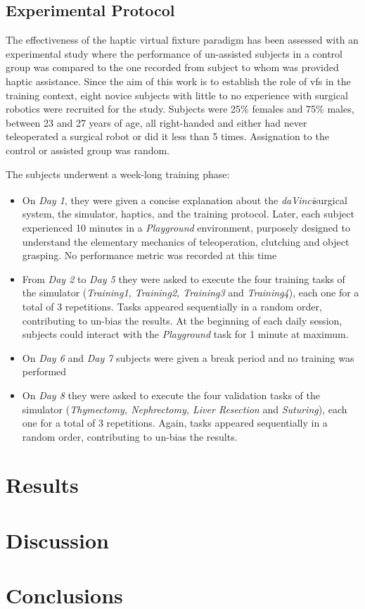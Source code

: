 \documentclass{article}
\newcommand{\cright}{\textsuperscript{\textregistered}\phantom{..}}
\begin{document}
\begin{multicols}{2}
\subsection{Experimental Protocol}
The effectiveness of the haptic virtual fixture paradigm has been assessed with an experimental study where the performance of un-assisted subjects in a control group was compared to the one recorded from subject to whom was provided haptic assistance. Since the aim of this work is to establish the role of \acp{vf} in the training context, eight novice subjects with little to no experience with surgical robotics were recruited for the study. Subjects were 25\% females and 75\% males, between 23 and 27 years of age, all right-handed and either had never teleoperated a surgical robot or did it less than 5 times. Assignation to the control or assisted group was random.

The subjects underwent a week-long training phase:
\begin{itemize}
  \item On \textit{Day 1}, they were given a concise explanation about the \textit{daVinci}\cright surgical system, the simulator, haptics, and the training protocol. Later, each subject experienced 10 minutes in a \textit{Playground} environment, purposely designed to understand the elementary mechanics of teleoperation, clutching and object grasping. No performance metric was recorded at this time
  \item From \textit{Day 2} to \textit{Day 5} they were asked to execute the four training tasks of the simulator (\textit{Training1, Training2, Training3} and \textit{Training4}), each one for a total of 3 repetitions. Tasks appeared sequentially in a random order, contributing to un-bias the results. At the beginning of each daily session, subjects could interact with the \textit{Playground} task for 1 minute at maximum.
  \item On \textit{Day 6} and \textit{Day 7} subjects were given a break period and no training was performed
  \item On \textit{Day 8} they were asked to execute the four validation tasks of the simulator (\textit{Thymectomy, Nephrectomy, Liver Resection} and \textit{Suturing}), each one for a total of 3 repetitions. Again, tasks appeared sequentially in a random order, contributing to un-bias the results.
\end{itemize}


\section{Results}
\section{Discussion}
\section{Conclusions}


\end{multicols}
\end{document}
